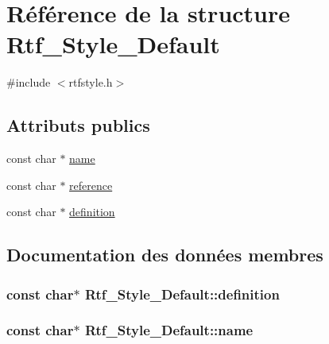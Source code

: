 \hypertarget{struct_rtf___style___default}{}\section{Référence de la structure Rtf\+\_\+\+Style\+\_\+\+Default}
\label{struct_rtf___style___default}


{\ttfamily \#include $<$rtfstyle.\+h$>$}

\subsection*{Attributs publics}
\begin{DoxyCompactItemize}
\item 
const char $\ast$ \hyperlink{struct_rtf___style___default_a6e3e9ffcccb14d865f1615b58b9e63a0}{name}
\item 
const char $\ast$ \hyperlink{struct_rtf___style___default_aba6478eff992fe32a526e6a7bb7571ca}{reference}
\item 
const char $\ast$ \hyperlink{struct_rtf___style___default_acab47ece3f92bcef2c1120043251e426}{definition}
\end{DoxyCompactItemize}


\subsection{Documentation des données membres}
\hypertarget{struct_rtf___style___default_acab47ece3f92bcef2c1120043251e426}{}
\subsubsection[{definition}]{\setlength{\rightskip}{0pt plus 5cm}const char$\ast$ Rtf\+\_\+\+Style\+\_\+\+Default\+::definition}\label{struct_rtf___style___default_acab47ece3f92bcef2c1120043251e426}
\hypertarget{struct_rtf___style___default_a6e3e9ffcccb14d865f1615b58b9e63a0}{}
\subsubsection[{name}]{\setlength{\rightskip}{0pt plus 5cm}const char$\ast$ Rtf\+\_\+\+Style\+\_\+\+Default\+::name}\label{struct_rtf___style___default_a6e3e9ffcccb14d865f1615b58b9e63a0}
\hypertarget{struct_rtf___style___default_aba6478eff992fe32a526e6a7bb7571ca}{}
